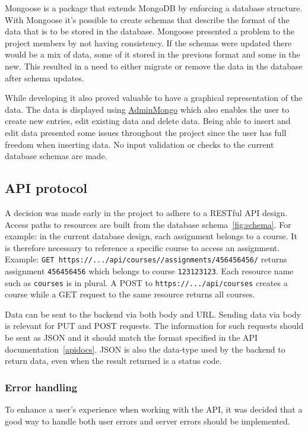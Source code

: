 Mongoose is a package that extends MongoDB by enforcing a database structure. With Mongoose it's possible to create schemas that describe the format of the data that is to be stored in the database. Mongoose presented a problem to the project members by not having consistency. If the schemas were updated there would be a mix of data, some of it stored in the previous format and some in the new. This resulted in a need to either migrate or remove the data in the database after schema updates.

While developing it also proved valuable to have a graphical representation of the data. The data is displayed using \href{https://github.com/mrvautin/adminMongo}{AdminMongo} which also enables the user to create new entries, edit existing data and delete data. Being able to insert and edit data presented some issues throughout the project since the user has full freedom when inserting data. No input validation or checks to the current database schemas are made.


\subsection{API protocol}
A decision was made early in the project to adhere to a RESTful API design. Access paths to resources are built from the database schema~\ref{fig:schema}. For example: in the current database design, each assignment belongs to a course. It is therefore necessary to reference a specific course to access an assignment. Example: \texttt{GET https://.../api/courses//assignments/456456456/} returns assignment \texttt{456456456} which belongs to course \texttt{123123123}. Each resource name such as \texttt{courses} is in plural. A POST to \texttt{https://.../api/courses} creates a course while a GET request to the same resource returns all courses.

Data can be sent to the backend via both body and URL. Sending data via body is relevant for PUT and POST requests. The information for such requests should be sent as JSON and it should match the format specified in the API documentation~\ref{apidocs}. JSON is also the data-type used by the backend to return data, even when the result returned is a status code.

\subsubsection{Error handling}
To enhance a user's experience when working with the API, it was decided that a good way to handle both user errors and server errors should be implemented.

